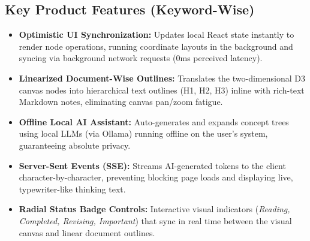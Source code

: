 \documentclass[12pt, a4paper]{article}
\begin{document}
\subsection{Key Product Features (Keyword-Wise)}
\begin{itemize}[leftmargin=*]
  \item \textbf{Optimistic UI Synchronization:} Updates local React state instantly to render node operations, running coordinate layouts in the background and syncing via background network requests (0ms perceived latency).
  \item \textbf{Linearized Document-Wise Outlines:} Translates the two-dimensional D3 canvas nodes into hierarchical text outlines (H1, H2, H3) inline with rich-text Markdown notes, eliminating canvas pan/zoom fatigue.
  \item \textbf{Offline Local AI Assistant:} Auto-generates and expands concept trees using local LLMs (via Ollama) running offline on the user's system, guaranteeing absolute privacy.
  \item \textbf{Server-Sent Events (SSE):} Streams AI-generated tokens to the client character-by-character, preventing blocking page loads and displaying live, typewriter-like thinking text.
  \item \textbf{Radial Status Badge Controls:} Interactive visual indicators (\textit{Reading, Completed, Revising, Important}) that sync in real time between the visual canvas and linear document outlines.
\end{itemize}
\end{document}
